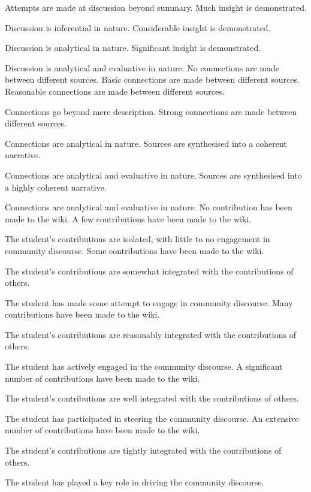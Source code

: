 \documentclass{../../fal_assignment}
\begin{document}
\begin{markingrubric}
        \par		Attempts are made at discussion beyond summary.
        \grade		Much insight is demonstrated.
        \par		Discussion is inferential in nature.
        \grade		Considerable insight is demonstrated.
        \par		Discussion is analytical in nature.
        \grade		Significant insight is demonstrated.
        \par		Discussion is analytical and evaluative in nature.
%
        \grade\fail No connections are made between different sources.
        \grade		Basic connections are made between different sources.
        \grade		Reasonable connections are made between different sources.
        \par		Connections go beyond mere description.
        \grade		Strong connections are made between different sources.
        \par		Connections are analytical in nature.
        \grade		Sources are synthesised into a coherent narrative.
        \par		Connections are analytical and evaluative in nature.
        \grade		Sources are synthesised into a highly coherent narrative.
        \par		Connections are analytical and evaluative in nature.
%
        \grade\fail 	No contribution has been made to the wiki.
        \grade 		A few contributions have been made to the wiki.
		\par		The student's contributions are isolated, with little to no engagement in community discourse.
        \grade 		Some contributions have been made to the wiki.
        \par		The student's contributions are somewhat integrated with the contributions of others.
        \par		The student has made some attempt to engage in community discourse.
        \grade 		Many contributions have been made to the wiki.
        \par		The student's contributions are reasonably integrated with the contributions of others.
        \par		The student has actively engaged in the community discourse.
        \grade 		A significant number of contributions have been made to the wiki.
        \par		The student's contributions are well integrated with the contributions of others.
        \par		The student has participated in steering the community discourse.
        \grade 		An extensive number of contributions have been made to the wiki.
        \par		The student's contributions are tightly integrated with the contributions of others.
        \par		The student has played a key role in driving the community discourse.
\end{markingrubric}
\end{document}
